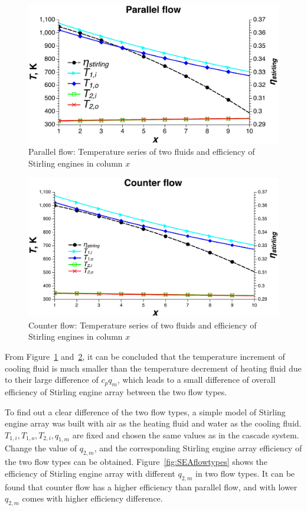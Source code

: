 \documentclass{article}
\begin{document}
\noindent \begin{figure}[htbp]
\begin{center}
	\includegraphics[width = 0.8\columnwidth, angle = 0]{./graphics/Parallelflow}
	\caption{Parallel flow: Temperature series of two fluids and efficiency of Stirling engines in column $x$}
	\label{fig:Parallelflow}
\end{center}
\end{figure}
\noindent \begin{figure}[H]
\begin{center}
	\includegraphics[width = 0.8\columnwidth, angle = 0]{./graphics/Counterflow}
	\caption{Counter flow: Temperature series of two fluids and efficiency of Stirling engines in column $x$}
	\label{fig:Counterflow}
\end{center}
\end{figure}

From Figure~\ref{fig:Parallelflow} and~\ref{fig:Counterflow}, it can be concluded that the temperature increment of cooling fluid is much smaller than the temperature decrement of heating fluid due to their large difference of $c_pq_m$, which leads to a small difference of overall efficiency of Stirling engine array between the two flow types.

To find out a clear difference of the two flow types, a simple model of Stirling engine array was built with air as the heating fluid and water as the cooling fluid. $T_{1,i}, T_{1,o}, T_{2,i}, q_{1,m}$ are fixed and chosen the same values as in the cascade system. Change the value of $q_{2,m}$, and the corresponding Stirling engine array efficiency of the two flow types can be obtained. Figure~\ref{fig:SEAflowtypes} shows the efficiency of Stirling engine array with different $q_{2,m}$ in two flow types. It can be found that counter flow has a higher efficiency than parallel flow, and with lower $q_{2,m}$ comes with higher efficiency difference.
\end{document}
